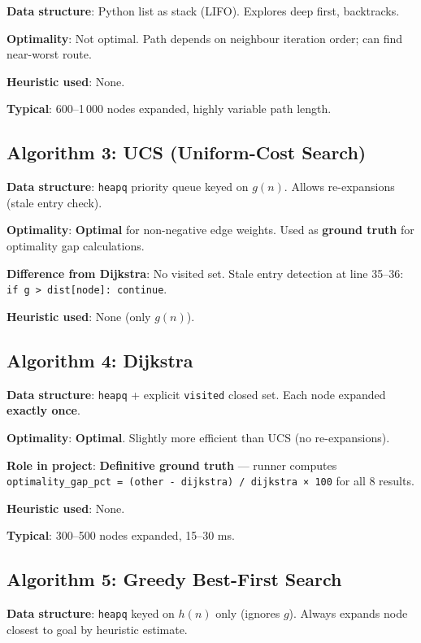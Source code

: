 \documentclass[11pt,a4paper]{article}
\begin{document}
\textbf{Data structure}: Python list as stack (LIFO). Explores deep first, backtracks.

\textbf{Optimality}: Not optimal. Path depends on neighbour iteration order; can find near-worst route.

\textbf{Heuristic used}: None.

\textbf{Typical}: 600–1\,000 nodes expanded, highly variable path length.

\subsection{Algorithm 3: UCS (Uniform-Cost Search)}

\textbf{Data structure}: \texttt{heapq} priority queue keyed on $g(n)$. Allows re-expansions (stale entry check).

\textbf{Optimality}: \textbf{Optimal} for non-negative edge weights. Used as \textbf{ground truth} for optimality gap calculations.

\textbf{Difference from Dijkstra}: No visited set. Stale entry detection at line 35–36: \texttt{if g > dist[node]: continue}.

\textbf{Heuristic used}: None (only $g(n)$).

\subsection{Algorithm 4: Dijkstra}

\textbf{Data structure}: \texttt{heapq} + explicit \texttt{visited} closed set. Each node expanded \textbf{exactly once}.

\textbf{Optimality}: \textbf{Optimal}. Slightly more efficient than UCS (no re-expansions).

\textbf{Role in project}: \textbf{Definitive ground truth} — runner computes \texttt{optimality\_gap\_pct = (other - dijkstra) / dijkstra × 100} for all 8 results.

\textbf{Heuristic used}: None.

\textbf{Typical}: 300–500 nodes expanded, 15–30 ms.

\subsection{Algorithm 5: Greedy Best-First Search}

\textbf{Data structure}: \texttt{heapq} keyed on $h(n)$ only (ignores $g$). Always expands node closest to goal by heuristic estimate.
\end{document}
